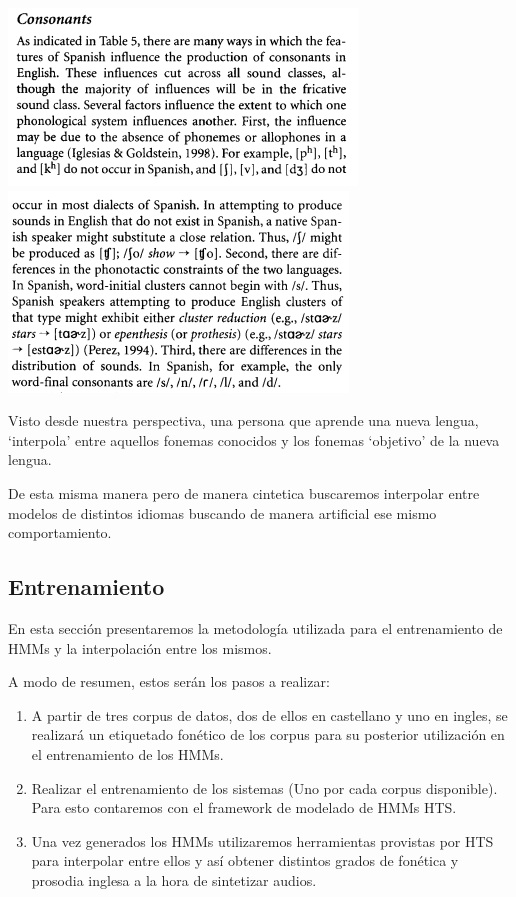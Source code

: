 \begin{center}
\includegraphics[scale=0.5]{imagenes_investigacion/consonantes1.png}
\includegraphics[scale=0.5]{imagenes_investigacion/consonantes2.png}
\end{center}


Visto desde nuestra perspectiva, una persona que aprende una nueva lengua, `interpola' entre aquellos fonemas conocidos y los fonemas `objetivo' de la nueva lengua.


De esta misma manera pero de manera cintetica buscaremos interpolar entre modelos de distintos idiomas buscando de manera artificial ese mismo comportamiento.

\subsection{Entrenamiento}

En esta sección presentaremos la metodología utilizada para el entrenamiento de HMMs y la interpolación entre los mismos.

A modo de resumen, estos serán los pasos a realizar:

\begin{enumerate}

\item A partir de tres corpus de datos, dos de ellos en castellano y uno en ingles, se realizará un etiquetado fonético de los corpus para su posterior utilización en el entrenamiento de los HMMs.

\item Realizar el entrenamiento de los sistemas (Uno por cada corpus disponible). Para esto contaremos con el framework de modelado de HMMs HTS. 

\item Una vez generados los HMMs utilizaremos herramientas provistas por HTS para interpolar entre ellos y así obtener distintos grados de fonética y prosodia inglesa a la hora de sintetizar audios.

\end{enumerate}

